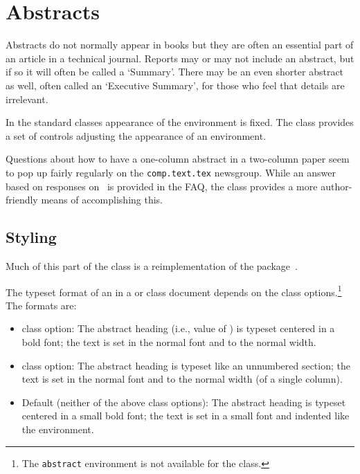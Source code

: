 \chapter{Abstracts}


    Abstracts do not normally appear in books but 
they are often an essential
part of an article in a technical journal. Reports may or may not
include an abstract, but if so it will often be called a `Summary'.
There may be an even shorter abstract as well, often called an 
`Executive Summary', for those who feel that details are irrelevant.

    In the standard classes appearance of the  environment
is fixed. The class provides a set of controls adjusting the appearance of
an  environment.

    Questions about how to have a 
one-column abstract in a 
two-column paper
seem to pop up fairly regularly on the
\texttt{comp.text.tex} newsgroup. While an answer based on responses
on \ctt\ is provided in the FAQ,
the class provides a more author-friendly means
of accomplishing this. 

\section{Styling}


    Much of this part of the class is a reimplementation of the 
 package~\cite{ABSTRACT}.

   The typeset format of an  in a  or 
 class document depends on the class
options.\footnote{The \texttt{abstract} environment is not 
available for the  class.} The formats are:
\begin{itemize}
\item {} class option: The abstract 
    heading (i.e., value of 
   \cmd{\abstractname}) is typeset centered in a bold font; the text is set in
   the normal font and to the normal width.
\item {} class option: The abstract 
   heading is typeset like
   an unnumbered section; the text is set in the normal font and to the
   normal width (of a single column). 
\item Default (neither of the above class options): The abstract 
   heading
   is typeset centered in a small bold font; the text is set in a small
   font and indented like the  environment.
\end{itemize}

